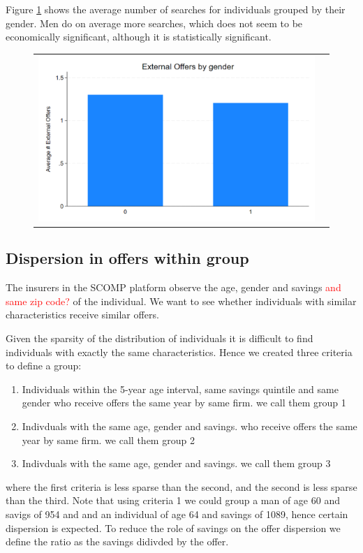 \documentclass[12pt]{article}
\begin{document}
Figure \ref{fig:ie3_4b} shows the average number of searches for individuals grouped by their gender. Men do on average  more searches, which does not seem to be economically significant, although it is statistically significant.


\begin{figure}[H]
\caption{}
\label{fig:ie3_4b}
\centering{}%
\begin{tabular}{cc}
\includegraphics[scale=0.27]{figures/IE3_search_by_gender.png}
\end{tabular}
\end{figure}


\subsection{Dispersion in offers within group}

The insurers in the SCOMP platform observe the age, gender and savings \textcolor{red}{and same zip code?} of the individual. We want to see whether individuals with similar characteristics receive similar offers. 

Given the sparsity of the distribution of individuals it is difficult to find individuals with exactly the same characteristics. Hence we created three criteria to define a group: 
\begin{enumerate}
    \item Individuals within the 5-year age interval, same savings quintile and same gender who receive offers the same year by same firm. we call them group 1  
    \item Indivduals with the same age, gender and savings. who receive offers the same year by same firm. we call them group 2
    \item   Indivduals with the same age, gender and savings. we call them group 3
\end{enumerate}
where the first criteria is less sparse than the second, and the second is less sparse than the third. 
Note that using criteria 1 we could group a man of age 60 and savigs of 954 and and an individual of age 64 and savings of 1089, hence certain dispersion is expected. To reduce the role of savings on the offer dispersion we define the ratio as the savings didivded by the offer. 
\end{document}
